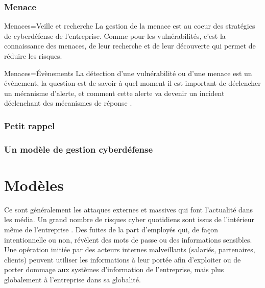 \begin{frame}
\frametitle<presentation>{Menace}

\begin{block}{Menaces=Veille et recherche}
	La gestion de la menace est au coeur des stratégies de cyberdéfense de l'entreprise. Comme pour les vulnérabilités, c'est la connaissance des menaces, de leur recherche et de leur découverte qui permet de réduire les risques.
\end{block}

\begin{block}{Menaces=Évènements}
   La détection d'une vulnérabilité ou d'une menace est un évènement, la question est de savoir à quel moment il est important de déclencher un mécanisme d'alerte, et comment cette alerte va devenir un incident déclenchant des mécanismes de réponse .
\end{block}

\end{frame}

\begin{frame}
\frametitle<presentation>{Petit rappel}
\end{frame}


\begin{frame}
\frametitle<presentation>{Un modèle de gestion cyberdéfense}
\end{frame}


\section{Modèles}

Ce sont généralement les attaques externes et massives qui font l’actualité dans les média. 
Un grand nombre de risques cyber quotidiens sont issus de l'intérieur même de l'entreprise .
Des  fuites de la part d'employés qui, de façon intentionnelle ou non, révèlent des mots de passe ou des informations sensibles. Une opération initiée par des acteurs internes malveillants (salariés, partenaires, clients) peuvent utiliser les informations à leur portée afin d’exploiter ou de porter dommage aux systèmes d'information de l’entreprise, mais plus globalement à l'entreprise dans sa globalité.

